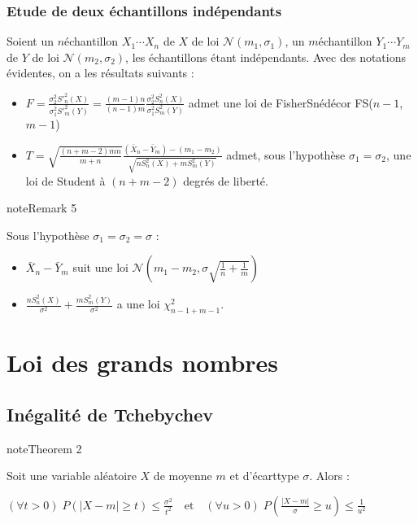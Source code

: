 \documentclass[letterpaper,10pt,french]{sphinxmanual}
\begin{document}
\subsubsection{Etude de deux échantillons indépendants}
\label{\detokenize{elemstats:etude-de-deux-echantillons-independants}}
\sphinxAtStartPar
Soient un \(n\)\sphinxhyphen{}échantillon \(X_1\cdots X_n\) de \(X\) de loi \(\mathcal{N}(m_1,\sigma_1)\), un \(m\)\sphinxhyphen{}échantillon \(Y_1\cdots Y_m\) de \(Y\) de loi \(\mathcal{N}(m_2,\sigma_2)\), les échantillons étant indépendants. Avec des notations évidentes, on a les résultats suivants :
\begin{itemize}
\item {} 
\sphinxAtStartPar
\(F = \frac{\sigma_2^2 S'^2_n(X)}{\sigma_1^2 S'^2_m(Y)} = \frac{(m-1)n}{(n-1)m}\frac{\sigma_2^2S_n^2(X)}{\sigma_1^2S_m^2(Y)}\) admet une loi de Fisher\sphinxhyphen{}Snédécor FS(\(n-1\),\(m-1\))

\item {} 
\sphinxAtStartPar
\(T = \sqrt{\frac{(n+m-2)mn}{m+n}}\frac{(\bar{X}_n-\bar{Y}_m)-(m_1-m_2)}{\sqrt{nS_n^2(X)+mS_m^2(Y)}}\) admet, sous l’hypothèse \(\sigma_1=\sigma_2\), une loi de Student à \((n+m-2)\) degrés de liberté.

\end{itemize}
\label{elemstats:remark-3}
\begin{sphinxadmonition}{note}{Remark 5}



\sphinxAtStartPar
Sous l’hypothèse \(\sigma_1=\sigma_2=\sigma\) :
\begin{itemize}
\item {} 
\sphinxAtStartPar
\(\bar{X}_n-\bar{Y}_m\) suit une loi \(\mathcal{N}(m_1-m_2,\sigma\sqrt{\frac1n+\frac1m})\)

\item {} 
\sphinxAtStartPar
\(\frac{nS_n^2(X)}{\sigma^2}+\frac{mS_m^2(Y)}{\sigma^2}\) a une loi \(\chi^2_{n-1+m-1}\).

\end{itemize}
\end{sphinxadmonition}


\section{Loi des grands nombres}
\label{\detokenize{elemstats:loi-des-grands-nombres}}

\subsection{Inégalité de Tchebychev}
\label{\detokenize{elemstats:inegalite-de-tchebychev}}\label{elemstats:theorem-4}
\begin{sphinxadmonition}{note}{Theorem 2}



\sphinxAtStartPar
Soit une variable aléatoire \(X\) de moyenne \(m\) et d’écart\sphinxhyphen{}type \(\sigma\). Alors :

\sphinxAtStartPar
\((\forall t>0)\; P(|X-m|\geq t)\leq \frac{\sigma^2}{t^2}\quad\textrm{et}\quad (\forall u>0)\; P(\frac{|X-m|}{\sigma}\geq u)\leq \frac{1}{u^2}\)
\end{sphinxadmonition}
\end{document}
